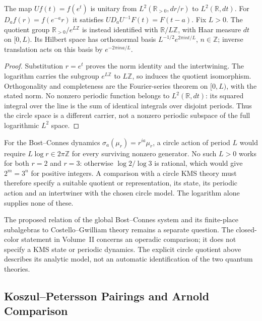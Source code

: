 \begin{proposition}
\label{v4-arith:w6-i:thm:W5-B-alignment}
The map $Uf(t)=f(e^t)$ is unitary from
$L^2(\mathbb R_{>0},dr/r)$ to $L^2(\mathbb R,dt)$.
For $D_af(r)=f(e^{-a}r)$ it satisfies
$UD_aU^{-1}F(t)=F(t-a)$.
Fix $L>0$. The quotient group
$\mathbb R_{>0}/e^{L\mathbb Z}$ is instead identified with
$\mathbb R/L\mathbb Z$, with Haar measure $dt$ on $[0,L)$.
Its Hilbert space has orthonormal basis
$L^{-1/2}e^{2\pi int/L}$, $n\in\mathbb Z$; inverse translation
acts on this basis by $e^{-2\pi ina/L}$.
\end{proposition}
\begin{proof}
Substitution $r=e^t$ proves the norm identity and the intertwining.
The logarithm carries the subgroup $e^{L\mathbb Z}$ to $L\mathbb Z$,
so induces the quotient isomorphism. Orthogonality and completeness
are the Fourier-series theorem on $[0,L)$, with the stated norm.
No nonzero periodic function belongs to $L^2(\mathbb R,dt)$:
its squared integral over the line is the sum of identical integrals
over disjoint periods. Thus the circle space is a different carrier,
not a nonzero periodic subspace of the full logarithmic $L^2$ space.
\end{proof}
For the Bost--Connes dynamics $\sigma_a(\mu_r)=r^{ia}\mu_r$,
a circle action of period $L$ would require $L\log r\in2\pi\mathbb Z$
for every surviving nonzero generator. No such $L>0$ works for
both $r=2$ and $r=3$: otherwise $\log2/\log3$ is rational, which
would give $2^m=3^n$ for positive integers. A comparison with a
circle KMS theory must therefore specify a suitable quotient or
representation, its state, its periodic action and an intertwiner
with the chosen circle model. The logarithm alone supplies none of these.
\begin{remark}
\label{v4-arith:w6-i:rem:W5-B-finite-extension}
The proposed relation of the global Bost--Connes system and its
finite-place subalgebras to Costello--Gwilliam theory remains a
separate question. The closed-color statement in Volume~II
concerns an operadic comparison; it does not specify a KMS state
or periodic dynamics. The explicit
circle quotient above describes its analytic model, not an automatic
identification of the two quantum theories.
\end{remark}

\subsection{Koszul--Petersson Pairings and Arnold Comparison}
\label{v4-arith:w6-i:W5-C-alignment}

